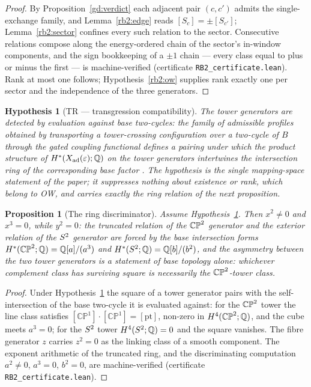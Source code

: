 \documentclass[11pt]{article}
\numberwithin{equation}{section}
\theoremstyle{plain}
\newtheorem{proposition}[theorem]{Proposition}
\newtheorem{hypothesis}[theorem]{Hypothesis}
\theoremstyle{definition}
\theoremstyle{remark}
\newcommand{\Xad}{X_{\mathrm{ad}}}
\begin{document}
\begin{proof}
By Proposition~\ref{gd:verdict} each adjacent pair $(c, c')$ admits
the single-exchange family, and Lemma~\ref{rb2:edge} reads
$[S_{c}] = \pm[S_{c'}]$; Lemma~\ref{rb2:sector} confines every such
relation to the sector. Consecutive relations compose along the
energy-ordered chain of the sector's in-window components, and the
sign bookkeeping of a $\pm 1$ chain --- every class equal to plus
or minus the first --- is machine-verified (certificate
\texttt{RB2\_certificate.lean}). Rank at most one follows;
Hypothesis~\ref{rb2:ow} supplies rank exactly one per sector and
the independence of the three generators.
\end{proof}

\begin{hypothesis}[TR --- transgression
compatibility]\label{rb2:tr}
The tower generators are detected by evaluation against base
two-cycles: the family of admissible profiles obtained by
transporting a tower-crossing configuration over a two-cycle of $B$
through the gated coupling functional defines a pairing under which
the product structure of $H^{*}(\Xad(\varepsilon); \Q)$ on the
tower generators intertwines the intersection ring of the
corresponding base factor \cite{BottTu1982}. The hypothesis is the
single mapping-space statement of the paper; it suppresses nothing
about existence or rank, which belong to OW, and carries exactly
the ring relation of the next proposition.
\end{hypothesis}

\begin{proposition}[The ring discriminator]\label{rb2:ring}
Assume Hypothesis~\textup{\ref{rb2:tr}}. Then $x^{2} \neq 0$ and
$x^{3} = 0$, while $y^{2} = 0$: the truncated relation of the
$\mathbb{CP}^2$ generator and the exterior relation of the $S^2$
generator are forced by the base intersection forms
$H^{*}(\mathbb{CP}^2; \mathbb{Q}) = \mathbb{Q}[a]/(a^{3})$ and
$H^{*}(S^2; \mathbb{Q}) = \mathbb{Q}[b]/(b^{2})$, and the asymmetry between the
two tower generators is a statement of base topology alone:
whichever complement class has surviving square is necessarily the
$\mathbb{CP}^2$-tower class.
\end{proposition}

\begin{proof}
Under Hypothesis~\ref{rb2:tr} the square of a tower generator pairs
with the self-intersection of the base two-cycle it is evaluated
against: for the $\mathbb{CP}^2$ tower the line class satisfies
$[\mathbb{CP}^{1}] \cdot [\mathbb{CP}^{1}] = [\mathrm{pt}]$, non-zero in
$H^{4}(\mathbb{CP}^2; \mathbb{Q})$, and the cube meets $a^{3} = 0$; for the
$S^2$ tower $H^{4}(S^2; \mathbb{Q}) = 0$ and the square vanishes. The
fibre generator $z$ carries $z^{2} = 0$ as the linking class of a
smooth component. The exponent arithmetic of the truncated ring,
and the discriminating computation $a^{2} \neq 0$, $a^{3} = 0$,
$b^{2} = 0$, are machine-verified (certificate
\texttt{RB2\_certificate.lean}).
\end{proof}
\end{document}

